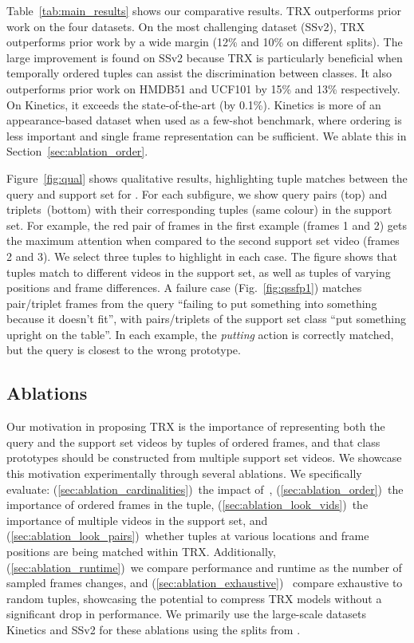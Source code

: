 \documentclass[final]{cvpr}
\begin{document}
Table~\ref{tab:main_results} shows our comparative results. 
TRX outperforms prior work on the four datasets. On the most challenging dataset (SSv2), TRX outperforms prior work by a wide margin (12\% and 10\% on different splits). 
The large improvement is found on SSv2 because TRX is particularly beneficial when temporally ordered tuples can assist the discrimination between classes. 
It also outperforms prior work on HMDB51 and UCF101 by 15\% and 13\% respectively.
On Kinetics, it exceeds the state-of-the-art (by 0.1\%).  
Kinetics is more of an appearance-based dataset when used as a few-shot benchmark, where ordering is less important and single frame representation can be sufficient.  We ablate this in Section~\ref{sec:ablation_order}.

Figure~\ref{fig:qual} shows qualitative results, highlighting tuple matches between the query and support set for . 
For each subfigure, we show query pairs (top) and triplets~(bottom)
with their corresponding tuples (same colour) in the support set. For example, the red pair of frames in the first example (frames 1 and 2) gets the maximum attention when compared to the second support set video (frames 2 and 3). We select three tuples to highlight in each case.
The figure shows that tuples match to different videos in the support set, as well as tuples of varying positions and frame differences.
A failure case (Fig.~\ref{fig:qssfp1}) matches pair/triplet frames from the query ``failing to put something into something because it doesn't fit'', with pairs/triplets of the support set class ``put something upright on the table''. In each example, the \textit{putting} action is correctly matched, but the query is closest to the wrong prototype.


\subsection{Ablations}\label{sec:ablation}


Our motivation in proposing TRX is the importance of representing both the query and the support set videos by tuples of ordered frames, and that class prototypes should be constructed from multiple support set videos. 
We showcase this motivation experimentally through several ablations. We specifically evaluate: (\ref{sec:ablation_cardinalities})~the impact of~, (\ref{sec:ablation_order})~the importance of ordered frames in the tuple, (\ref{sec:ablation_look_vids})~the importance of multiple videos in the support set, and (\ref{sec:ablation_look_pairs})~whether tuples at various locations and frame positions are being matched within TRX. 
Additionally, (\ref{sec:ablation_runtime})~we compare performance and runtime as the number of sampled frames changes, and  (\ref{sec:ablation_exhaustive})~ compare exhaustive to random tuples, showcasing the potential to compress TRX models without a significant drop in performance. We primarily use the large-scale datasets Kinetics and SSv2 for these ablations using the splits from \cite{Zhu2018,Zhu2020}.
\end{document}
